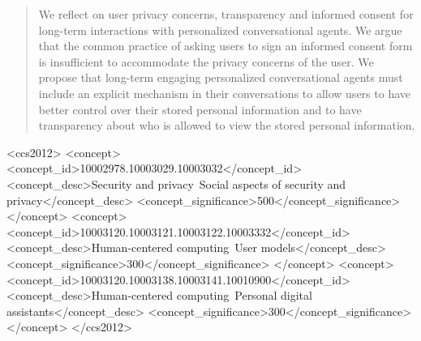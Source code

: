 \documentclass[sigchi-a,nonacm]{acmart}
\begin{document}
\begin{abstract}
We reflect on user privacy concerns, transparency and informed consent for long-term interactions with personalized conversational agents.
We argue that the common practice of asking users to sign an informed consent form is insufficient to accommodate the privacy concerns of the user. We propose that long-term engaging personalized conversational agents must include an explicit mechanism in %
their conversations to allow users to have better control over their stored personal information and to have transparency about who is allowed to view the stored personal information.
\end{abstract}

\begin{CCSXML}
<ccs2012>
   <concept>
       <concept_id>10002978.10003029.10003032</concept_id>
       <concept_desc>Security and privacy~Social aspects of security and privacy</concept_desc>
       <concept_significance>500</concept_significance>
    </concept>
    <concept>
        <concept_id>10003120.10003121.10003122.10003332</concept_id>
        <concept_desc>Human-centered computing~User models</concept_desc>
        <concept_significance>300</concept_significance>
    </concept>
    <concept>
       <concept_id>10003120.10003138.10003141.10010900</concept_id>
       <concept_desc>Human-centered computing~Personal digital assistants</concept_desc>
       <concept_significance>300</concept_significance>
   </concept>
</ccs2012>
\end{CCSXML}




\maketitle
\end{document}

